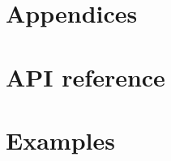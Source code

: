 \documentclass[twoside,11pt]{article}
\begin{document}
\renewcommand{\appendixpagename}{}
\begin{appendices}
  \section*{Appendices}

  \section{API reference}
  \label{appendix:a}

  \section{Examples}
  \label{appendix:b}

\end{appendices}


\end{document}
